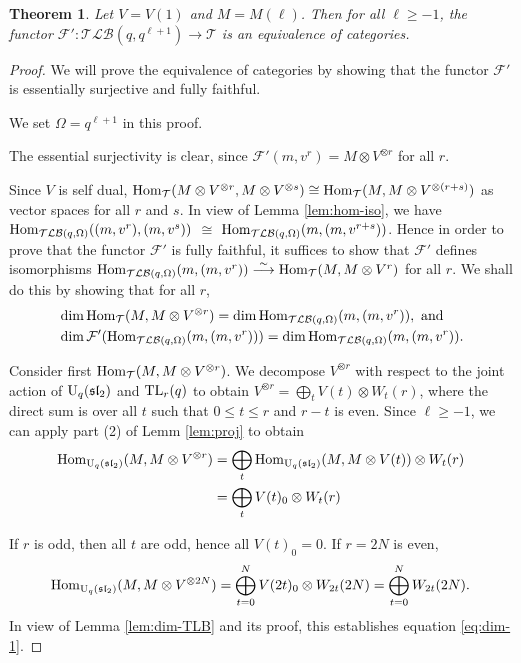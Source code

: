 \documentclass[12pt]{amsart}
\newtheorem{theorem}{Theorem}[section]
\theoremstyle{definition}
\theoremstyle{remark}
\numberwithin{equation}{section}
\newcommand{\CF}{{\mathcal F}}
\newcommand{\CT}{{\mathcal T}}
\newcommand{\U}{{\rm{U}}}
\newcommand{\Hom}{{\rm{Hom}}}
\newcommand{\TL}{{\rm{TL}}}
\newcommand{\fsl}{{\mathfrak {sl}}}
\newcommand{\TLBC}{\mathcal{TLB}}
\begin{document}
\begin{theorem}  \label{thm:main} Let $V=V(1)$ and $M=M(\ell)$. Then for all $\ell\ge -1$, the functor 
$
\CF':  \TLBC(q, q^{\ell+1})\longrightarrow \CT
$ 
is an equivalence of categories. 

\end{theorem}
\begin{proof} We will prove the equivalence of categories by showing  that the functor $\CF'$ is essentially surjective and fully faithful. 

We set $\Omega=q^{\ell+1}$ in this proof. 

The essential surjectivity is clear, since  $\CF'(m, v^r) = M\otimes V^{\otimes r}$ for all $r$.

Since $V$ is self dual, $\Hom_\CT(M\otimes V^{\otimes r}, M\otimes V^{\otimes s})\cong 
\Hom_\CT(M, M\otimes V^{\otimes (r+s)})$ as vector spaces for all $r$ and $s$. In view of Lemma \ref{lem:hom-iso}, we have 
$\Hom_{\TLBC(q, \Omega)}((m, v^r), (m, v^s))$ $\cong$  $\Hom_{\TLBC(q, \Omega)}(m, (m, v^{r+s}))$. Hence in order to prove that 
the functor $\CF'$ is fully faithful, it suffices to show that 
%
$\CF'$ defines isomorphisms $\Hom_{\TLBC(q, \Omega)}(m, (m, v^r))\stackrel{\sim}
\longrightarrow \Hom_\CT(M, M\otimes V^r)$ for all $r$.
We shall do this by showing that  for all $r$, 
\begin{eqnarray}
&\dim\Hom_\CT(M,  M\otimes V^{\otimes r}) = \dim\Hom_{\TLBC(q, \Omega)}(m, (m, v^r)), \label{eq:dim-1}\text{ and }\\
&\dim\CF'(\Hom_{\TLBC(q, \Omega)}(m, (m, v^r))) = \dim\Hom_{\TLBC(q, \Omega)}(m, (m, v^r)).  \label{eq:dim-2}
\end{eqnarray}


Consider first $\Hom_\CT(M,  M\otimes V^{\otimes r})$. We decompose $V^{\otimes r}$ 
with respect to the joint action of $\U_q(\fsl_2)$ and $\TL_r(q)$ to obtain $V^{\otimes r} =\bigoplus_t V(t)\otimes W_{t}(r)$, 
where the direct sum is over all $t$ such that  $0\le t\le r$ and $r-t$ is even.  Since $\ell\ge -1$, we can apply 
part (2) of Lemm \ref{lem:proj} to obtain
\[
\begin{aligned}
\Hom_{\U_q(\fsl_2)}(M,  M\otimes V^{\otimes r})
&=\bigoplus_t \Hom_{\U_q(\fsl_2)}(M,  M\otimes V(t))\otimes W_{t}(r)\\
&=\bigoplus_t V(t)_0\otimes W_t(r)\\
\end{aligned}
\]

If $r$ is odd, then all $t$ are odd, hence all $V(t)_0=0$.  
If $r=2N$ is even,  
\[
\begin{aligned}
\Hom_{\U_q(\fsl_2)}(M,  M\otimes V^{\otimes 2N})=\bigoplus_{t=0}^N  V(2t)_0\otimes W_{2t}(2N)
=\bigoplus_{t=0}^N  W_{2t}(2N). 
\end{aligned}
\]
In view of Lemma \ref{lem:dim-TLB} and its proof, this establishes equation \eqref{eq:dim-1}.  


\end{proof}
\end{document}
